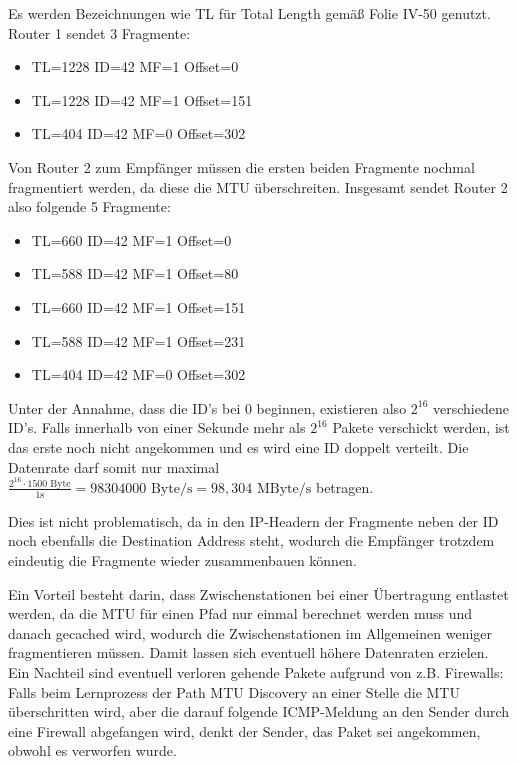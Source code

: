 \documentclass{../exercisesheet}
\begin{document}
\begin{exercise}{6}
\begin{subexercise}
Es werden Bezeichnungen wie TL für Total Length gemäß Folie IV-50 genutzt.\\
	Router 1 sendet 3 Fragmente:
	\begin{itemize}
	\item TL=1228 ID=42 MF=1 Offset=0
	\item TL=1228 ID=42 MF=1 Offset=151
	\item TL=404 ID=42 MF=0 Offset=302
	\end{itemize}
	Von Router 2 zum Empfänger müssen die ersten beiden Fragmente nochmal fragmentiert werden, da diese die MTU überschreiten. Insgesamt sendet Router 2 also folgende
	5 Fragmente:
	\begin{itemize}
	\item TL=660 ID=42 MF=1 Offset=0
	\item TL=588 ID=42 MF=1 Offset=80
	\item TL=660 ID=42 MF=1 Offset=151
	\item TL=588 ID=42 MF=1 Offset=231
	\item TL=404 ID=42 MF=0 Offset=302
	\end{itemize}
\end{subexercise}
\begin{subexercise}
Unter der Annahme, dass die ID's bei 0 beginnen, existieren also $2^{16}$ verschiedene ID's. Falls innerhalb von einer Sekunde mehr als $2^{16}$ Pakete verschickt werden, ist das erste
noch nicht angekommen und es wird eine ID doppelt verteilt. Die Datenrate darf somit nur maximal $\frac{2^{16} \cdot 1500 \text{ Byte}}{1\text{s}}= 
98304000 \text{ Byte/s}= 98,304 \text{ MByte/s}$ betragen.
\end{subexercise}
\begin{subexercise}
Dies ist nicht problematisch, da in den IP-Headern der Fragmente neben der ID noch ebenfalls die Destination Address steht, wodurch die Empfänger trotzdem eindeutig die Fragmente
wieder zusammenbauen können.
\end{subexercise}
\begin{subexercise}
Ein Vorteil besteht darin, dass Zwischenstationen bei einer Übertragung entlastet werden, da die MTU für einen Pfad nur einmal berechnet werden muss und danach gecached wird, 
wodurch die Zwischenstationen im Allgemeinen weniger fragmentieren müssen. Damit lassen sich eventuell höhere Datenraten erzielen.\\
Ein Nachteil sind eventuell verloren gehende Pakete aufgrund von z.B. Firewalls: Falls beim Lernprozess der Path MTU Discovery an einer Stelle die MTU überschritten wird, aber
die darauf folgende ICMP-Meldung an den Sender durch eine Firewall abgefangen wird, denkt der Sender, das Paket sei angekommen, obwohl es verworfen wurde.
\end{subexercise}
\end{exercise}
\end{document}
